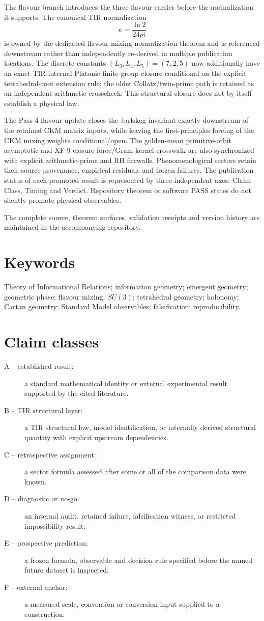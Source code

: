 \documentclass[11pt,a4paper,twoside]{book}
\def\pi{pi}%
\theoremstyle{definition}
\begin{document}
The flavour branch introduces the three-flavour carrier before the normalization it supports. The canonical TIR normalization
\[
\kappa=\frac{\ln2}{24\pi}
\]
is owned by the dedicated flavour-mixing normalization theorem and is referenced downstream rather than independently re-derived in multiple publication locations. The discrete constants $(L_3,L_4,L_5)=(7,2,5)$ now additionally have an exact TIR-internal Platonic finite-group closure conditional on the explicit tetrahedral-root extension rule; the older Collatz/twin-prime path is retained as an independent arithmetic crosscheck. This structural closure does not by itself establish a physical law.

The Pass-4 flavour update closes the Jarlskog invariant exactly downstream of the retained CKM matrix inputs, while leaving the first-principles forcing of the CKM mixing weights conditional/open. The golden-mean primitive-orbit asymptotic and XF-9 closure-force/Gram-kernel crosswalk are also synchronized with explicit arithmetic-prime and RH firewalls. Phenomenological sectors retain their source provenance, empirical residuals and frozen failures. The publication status of each promoted result is represented by three independent axes: Claim Class, Timing and Verdict. Repository theorem or software PASS states do not silently promote physical observables.

The complete source, theorem surfaces, validation receipts and version history are maintained in the accompanying repository.

\section*{Keywords}
Theory of Informational Relations; information geometry; emergent geometry; geometric phase; flavour mixing; $SU(3)$; tetrahedral geometry; holonomy; Cartan geometry; Standard Model observables; falsification; reproducibility.

\section*{Claim classes}
\begin{description}
  \item[A -- established result:] a standard mathematical identity or external experimental result supported by the cited literature.
  \item[B -- TIR structural layer:] a TIR structural law, model identification, or internally derived structural quantity with explicit upstream dependencies.
  \item[C -- retrospective assignment:] a sector formula assessed after some or all of the comparison data were known.
  \item[D -- diagnostic or no-go:] an internal audit, retained failure, falsification witness, or restricted impossibility result.
  \item[E -- prospective prediction:] a frozen formula, observable and decision rule specified before the named future dataset is inspected.
  \item[F -- external anchor:] a measured scale, convention or conversion input supplied to a construction.
\end{description}
\end{document}

